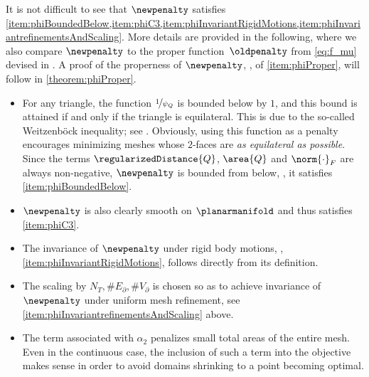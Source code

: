 It is not difficult to see that $\newpenalty$ satisfies \cref{item:phiBoundedBelow,item:phiC3,item:phiInvariantRigidMotions,item:phiInvariantrefinementsAndScaling}.
More details are provided in the following, where we also compare $\newpenalty$ to the proper function~$\oldpenalty$ from \eqref{eq:f_mu} devised in \cite{HerzogLoayzaRomero:2022:1}.
A proof of the properness of $\newpenalty$, \ie, of \cref{item:phiProper}, will follow in \cref{theorem:phiProper}.
\begin{itemize}
	\item
		For any triangle, the function $\nicefrac{1}{\psi_Q}$ is bounded below by $1$, and this bound is attained if and only if the triangle is equilateral.
		This is due to the so-called Weitzenböck inequality; see \cite{AlsinaNelsen:2008:1}.
		Obviously, using this function as a penalty encourages minimizing meshes whose $2$-faces are \emph{as equilateral as possible}.
		Since the terms $\regularizedDistance{Q}$, $\area{Q}$ and $\norm{\cdot}_F$ are always non-negative, $\newpenalty$ is bounded from below, \ie, it satisfies \cref{item:phiBoundedBelow}.

	\item
		$\newpenalty$ is also clearly smooth on $\planarmanifold$ and thus satisfies \cref{item:phiC3}.

	\item
		The invariance of $\newpenalty$ under rigid body motions, \ie, \cref{item:phiInvariantRigidMotions}, follows directly from its definition.

	\item
		The scaling by $N_T,\#E_\partial, \#V_\partial$ is chosen so as to achieve invariance of $\newpenalty$ under uniform mesh refinement, see \cref{item:phiInvariantrefinementsAndScaling} above.

	\item
		The term associated with $\alpha_2$ penalizes small total areas of the entire mesh.
		Even in the continuous case, the inclusion of such a term into the objective makes sense in order to avoid domains shrinking to a point becoming optimal.
\end{itemize}

